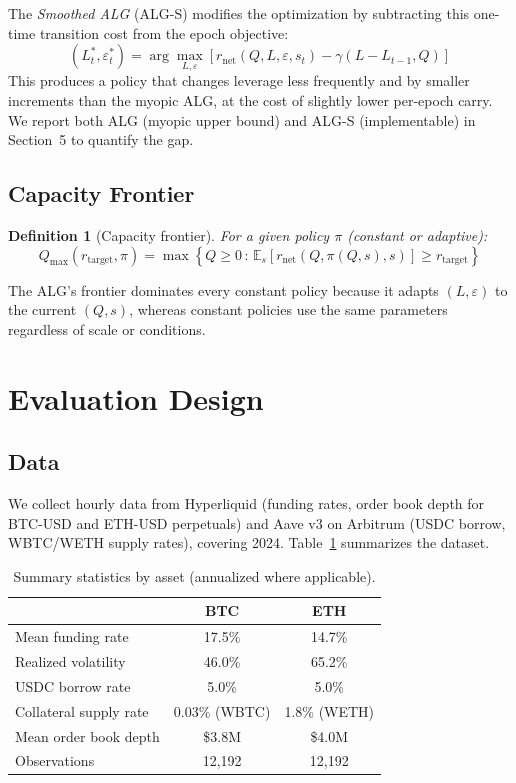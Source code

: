 \documentclass[11pt]{article}
\newtheorem{definition}{Definition}
\begin{document}
The \textit{Smoothed ALG} (ALG-S) modifies the optimization by subtracting this one-time transition cost from the epoch objective:
\[
(L_t^*, \varepsilon_t^*) = \arg\max_{L, \varepsilon} \left[ r_{\text{net}}(Q, L, \varepsilon, s_t) - \gamma(L - L_{t-1}, Q) \right]
\]
This produces a policy that changes leverage less frequently and by smaller increments than the myopic ALG, at the cost of slightly lower per-epoch carry. We report both ALG (myopic upper bound) and ALG-S (implementable) in Section~5 to quantify the gap.

\subsection{Capacity Frontier}

\begin{definition}[Capacity frontier]
For a given policy $\pi$ (constant or adaptive):
\[
Q_{\max}(r_{\text{target}}, \pi) = \max \left\{ Q \geq 0 \, : \, \mathbb{E}_s[r_{\text{net}}(Q, \pi(Q,s), s)] \geq r_{\text{target}} \right\}
\]
\end{definition}

The ALG's frontier dominates every constant policy because it adapts $(L, \varepsilon)$ to the current $(Q, s)$, whereas constant policies use the same parameters regardless of scale or conditions.

\section{Evaluation Design}

\subsection{Data}

We collect hourly data from Hyperliquid (funding rates, order book depth for BTC-USD and ETH-USD perpetuals) and Aave v3 on Arbitrum (USDC borrow, WBTC/WETH supply rates), covering 2024. Table~\ref{tab:data_summary} summarizes the dataset.

\begin{table}[htbp]
\centering
\caption{Summary statistics by asset (annualized where applicable).}
\label{tab:data_summary}
\begin{tabular}{lcc}
\toprule
& \textbf{BTC} & \textbf{ETH} \\
\midrule
Mean funding rate & 17.5\% & 14.7\% \\
Realized volatility & 46.0\% & 65.2\% \\
USDC borrow rate & 5.0\% & 5.0\% \\
Collateral supply rate & 0.03\% (WBTC) & 1.8\% (WETH) \\
Mean order book depth & \$3.8M & \$4.0M \\
Observations & 12,192 & 12,192 \\
\bottomrule
\end{tabular}
\end{table}
\end{document}
